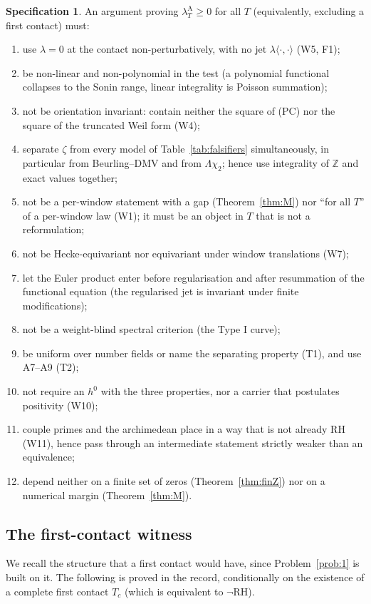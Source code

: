 \documentclass[11pt]{amsart}
\theoremstyle{definition}
\newtheorem{condition}[theorem]{Specification}
\theoremstyle{remark}
\newcommand{\Z}{\mathbb Z}
\newcommand{\lamA}{\lambda^{\mathrm A}_T}
\begin{document}
\begin{condition}\label{spec}
An argument proving $\lamA\ge0$ for all $T$ (equivalently, excluding a first contact) must:
\begin{enumerate}
\item[S1] use $\lambda=0$ at the contact non-perturbatively, with no jet $\lambda\langle\cdot,\cdot\rangle$ (W5, F1);
\item[S2] be non-linear and non-polynomial in the test (a polynomial functional collapses to the Sonin
 range, linear integrality is Poisson summation);
\item[S3] not be orientation invariant: contain neither the square of (PC) nor the square of the truncated
 Weil form (W4);
\item[S4] separate $\zeta$ from every model of Table~\ref{tab:falsifiers} simultaneously, in particular from
 Beurling--DMV and from $\Lambda\chi_2$; hence use integrality of $\Z$ and exact values together;
\item[S5] not be a per-window statement with a gap (Theorem~\ref{thm:M}) nor ``for all $T$'' of a per-window
 law (W1); it must be an object in $T$ that is not a reformulation;
\item[S6] not be Hecke-equivariant nor equivariant under window translations (W7);
\item[S7] let the Euler product enter before regularisation and after resummation of the functional
 equation (the regularised jet is invariant under finite modifications);
\item[S8] not be a weight-blind spectral criterion (the Type I curve);
\item[S9] be uniform over number fields or name the separating property (T1), and use A7--A9 (T2);
\item[S10] not require an $h^0$ with the three properties, nor a carrier that postulates positivity (W10);
\item[S11] couple primes and the archimedean place in a way that is not already RH (W11), hence pass through
 an intermediate statement strictly weaker than an equivalence;
\item[S12] depend neither on a finite set of zeros (Theorem~\ref{thm:finZ}) nor on a numerical margin
 (Theorem~\ref{thm:M}).
\end{enumerate}
\end{condition}

\subsection{The first-contact witness}
We recall the structure that a first contact would have, since Problem~\ref{prob:1} is built on it. The
following is proved in the record, conditionally on the existence of a complete first contact $T_c$
(which is equivalent to $\neg$RH).
\end{document}
